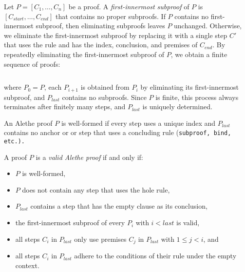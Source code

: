 \begin{definition}
Let $P = [C_1, \ldots, C_n]$ be a proof. 
A \emph{first-innermost subproof} of $P$ is $[C_{\mathit{start}}, \ldots, C_{\mathit{end}}]$ that contains no proper subproofs.
If $P$ contains no first-innermost subproof, then eliminating subproofs leaves $P$ unchanged. 
Otherwise, we eliminate the first-innermost subproof by replacing it with a single step $C'$  that uses the  rule and has the index, conclusion, and premises of $C_{\mathit{end}}$. 
By repeatedly eliminating the first-innermost subproof of $P$, we obtain a finite sequence of proofs:

\begin{equation*}
[P_0, P_1, P_2, \ldots, P_{\mathit{last}}]  
\end{equation*}

where $P_0 = P$, each $P_{i+1}$ is obtained from $P_i$ by eliminating its 
first-innermost subproof, and $P_{\mathit{last}}$ contains no subproofs. 
Since $P$ is finite, this process always terminates after finitely many steps, 
and $P_{\mathit{last}}$ is uniquely determined.
\end{definition}

\begin{definition}\label{def:well-formed-alethe}
An Alethe proof $P$ is well-formed if every step uses a unique index and $P_{last}$ contains no anchor or
or step that uses a concluding rule (\tt{subproof}, \tt{bind}, etc.).
\end{definition}

\begin{definition}\label{def:valid-alethe-proof}
A proof $P$ is a \emph{valid Alethe proof} if and only if:
\begin{itemize}
\item $P$ is well-formed,
\item $P$ does not contain any step that uses the hole rule,
\item $P_{\mathit{last}}$ contains a step that has the empty clause as its conclusion,
\item the first-innermost subproof of every $P_i$ with $i < \mathit{last}$ is valid,
\item all steps $C_i$ in $P_{\mathit{last}}$ only use premises $C_j$ in $P_{\mathit{last}}$ with $1 \leq j < i$, and
\item all steps $C_i$ in $P_{\mathit{last}}$ adhere to the conditions of their rule under the empty context.
\end{itemize}
\end{definition}

